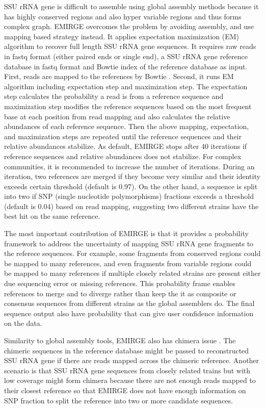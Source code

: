 \documentclass[]{msu-thesis}
\begin{document}
SSU rRNA gene is difficult to assemble using global assembly methods
because it has highly conserved regions and also hyper variable
regions and thus forms complex graph. EMIRGE overcomes the problem by
avoiding assembly, and use mapping based strategy instead. It applies
expectation maximization (EM) algorithm to recover full length SSU
rRNA gene sequences. It requires raw reads in fastq format (either
paired ends or single end), a SSU rRNA gene reference database in
fastq format and Bowtie index of the reference database as
input. First, reads are mapped to the references by Bowtie
\cite{langmead_aligning_2010}. Second, it runs EM algorithm including
expectation step and maximization step. The expectation step
calculates the probability a read is from a reference sequence and
maximization step modifies the reference sequences based on the most
frequent base at each position from read mapping and also calculates
the relative abundances of each reference sequence. Then the above
mapping, expectation, and maximization steps are repeated until the
reference sequences and their relative abundances stabilize. As
default, EMIRGE stops after 40 iterations if reference sequences and
relative abundances does not stabilize. For complex communities, it is
recommended to increase the number of iterations. During an iteration,
two references are merged if they become very similar and their
identity exceeds certain threshold (default is 0.97). On the other
hand, a sequence is split into two if SNP (single nucleotide
polymorphisms) fractions exceeds a threshold (default is 0.04) based
on read mapping, suggesting two different strains have the best hit on
the same reference.

The most important contribution of EMIRGE is that it provides a
probability framework to address the uncertainty of mapping SSU rRNA
gene fragments to the referece sequences. For example, some fragments
from conserved regions could be mapped to many references, and even
fragments from variable regions could be mapped to many references if
multiple closely related strains are present either due sequencing
error or missing references. This probability frame enables references
to merge and to diverge rather than keep the it as composite or
consensus sequences from different strains as the global assemblers
do. The final sequence output also have probability that can give user
confidence information on the data.

Similarity to global assembly tools, EMIRGE also has chimera issue
\cite{rajeev_dynamic_2013}. The chimeric sequences in the reference
database might be passed to reconstructed SSU rRNA gene if there are
reads mapped across the chimeric reference. Another scenario is that
SSU rRNA gene sequences from closely related trains but with low
coverage might form chimera because there are not enough reads mapped
to their closest reference so that EMIRGE does not have enough
information on SNP fraction to split the reference into two or more
candidate sequences.
\end{document}
